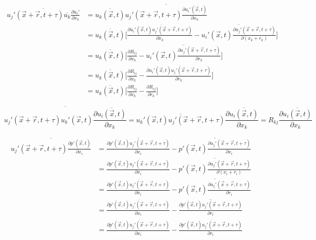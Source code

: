 \documentclass[paper=a4, fontsize=11pt]{scrartcl} %
\numberwithin{equation}{section} %
\numberwithin{figure}{section} %
\numberwithin{table}{section} %
\begin{document}
	\begin{equation}
		\begin{aligned}
			\overline{u_j'(\vec{x} + \vec{r}, t+\tau) \overline{u_k}\frac{\partial u_i'}{\partial x_k}} 
			& = \overline{u_k(\vec{x}, t)} \overline{u_j'(\vec{x} + \vec{r}, t+\tau) \frac{\partial u_i'(\vec{x}, t)}{\partial x_k}}\\
			& = \overline{u_k(\vec{x}, t)} \Bigg[\frac{\partial \overline{u_i'(\vec{x}, t) u_j'(\vec{x} + \vec{r}, t+\tau)}}{\partial x_k}- \overline{u_i'(\vec{x}, t) \frac{\partial u_j'(\vec{x} + \vec{r}, t+\tau)}{\partial (x_k + r_k)}}\Bigg]\\
			& = \overline{u_k(\vec{x}, t)} \Bigg[\frac{\partial R_{ij}}{\partial x_k}- \overline{u_i'(\vec{x}, t) \frac{\partial u_j'(\vec{x} + \vec{r}, t+\tau)}{\partial r_k}}\Bigg]\\
			& = \overline{u_k(\vec{x}, t)} \Bigg[\frac{\partial R_{ij}}{\partial x_k}- \frac{\partial \overline{u_i'(\vec{x}, t) u_j'(\vec{x} + \vec{r}, t+\tau)}}{\partial r_k}\Bigg]\\
			& = \overline{u_k(\vec{x}, t)} \Bigg[\frac{\partial R_{ij}}{\partial x_k}- \frac{\partial R_{ij}}{\partial r_k}\Bigg]
		\end{aligned}
	\end{equation}
	
	\begin{equation}
			\overline{u_j'(\vec{x} + \vec{r}, t+\tau) u_k'(\vec{x}, t) \frac{\partial \overline{u_i(\vec{x}, t)}}{\partial x_k}} = \overline{u_k'(\vec{x}, t) u_j'(\vec{x} + \vec{r}, t+\tau)} \frac{\partial \overline{u_i(\vec{x}, t)}}{\partial x_k} = R_{kj}\frac{\partial \overline{u_i(\vec{x}, t)}}{\partial x_k}
	\end{equation}
	
	\begin{equation}
		\begin{aligned}
			\overline{u_j'(\vec{x} + \vec{r}, t+\tau) \frac{\partial p'(\vec{x}, t)}{\partial x_i}} 
			& = \overline{\frac{\partial p'(\vec{x}, t) u_j'(\vec{x} + \vec{r}, t+\tau)}{\partial x_i}} - \overline{p'(\vec{x}, t) \frac{\partial u_j'(\vec{x} + \vec{r}, t+\tau)}{\partial x_i}}\\
			& = \frac{\partial \overline{p'(\vec{x}, t) u_j'(\vec{x} + \vec{r}, t+\tau)}}{\partial x_i} - \overline{p'(\vec{x}, t) \frac{\partial u_j'(\vec{x} + \vec{r}, t+\tau)}{\partial (x_i + r_i)}}\\
			& = \frac{\partial \overline{p'(\vec{x}, t) u_j'(\vec{x} + \vec{r}, t+\tau)}}{\partial x_i} - \overline{p'(\vec{x}, t) \frac{\partial u_j'(\vec{x} + \vec{r}, t+\tau)}{\partial r_i}}\\
			& = \frac{\partial \overline{p'(\vec{x}, t) u_j'(\vec{x} + \vec{r}, t+\tau)}}{\partial x_i} - \overline{\frac{\partial p'(\vec{x}, t) u_j'(\vec{x} + \vec{r}, t+\tau)}{\partial r_i}}\\
			& = \frac{\partial \overline{p'(\vec{x}, t) u_j'(\vec{x} + \vec{r}, t+\tau)}}{\partial x_i} - \frac{\partial \overline{p'(\vec{x}, t) u_j'(\vec{x} + \vec{r}, t+\tau)}}{\partial r_i}
		\end{aligned}
	\end{equation}
	
\end{document}
